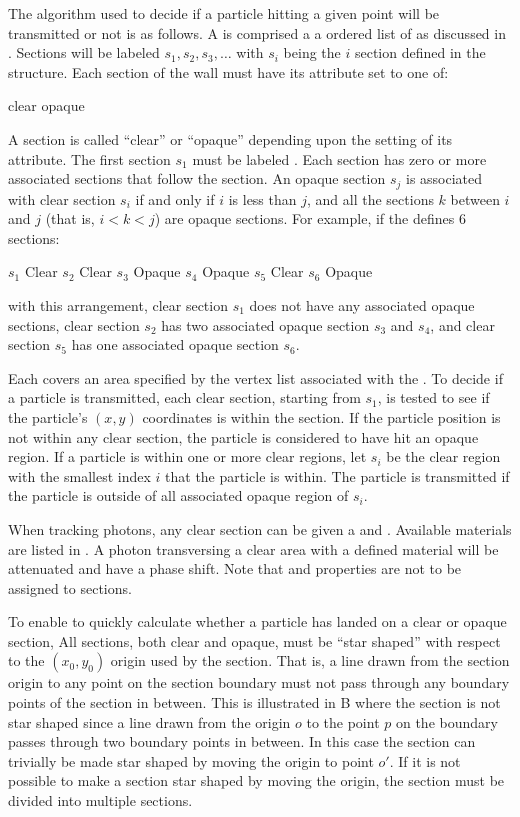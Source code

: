 The algorithm used to decide if a particle hitting a given point will be transmitted or not is as
follows.  A  is comprised a a ordered list of  as discussed in
.  Sections will be labeled $s_1, s_2, s_3, \ldots$ with $s_i$ being the $i$\Th
section defined in the  structure. Each section of the wall must have its 
attribute set to one of:
\begin{example}
  clear
  opaque
\end{example}
A section is called ``clear'' or ``opaque'' depending upon the setting of its  attribute.
The first section $s_1$ must be labeled . Each  section has zero or more
associated  sections that follow the  section. An opaque section $s_j$ is
associated with clear section $s_i$ if and only if $i$ is less than $j$, and all the sections $k$
between $i$ and $j$ (that is, $i < k < j$) are opaque sections. For example, if the 
defines 6 sections:
\begin{example}
  \(s_1\)   Clear
  \(s_2\)   Clear
  \(s_3\)   Opaque
  \(s_4\)   Opaque
  \(s_5\)   Clear
  \(s_6\)   Opaque
\end{example}
with this arrangement, clear section $s_1$ does not have any associated opaque sections, clear section
$s_2$ has two associated opaque section $s_3$ and $s_4$, and clear section $s_5$ has one associated
opaque section $s_6$.

Each  covers an area specified by the vertex list associated with the . To
decide if a particle is transmitted, each clear section, starting from $s_1$, is tested to see if
the particle's $(x,y)$ coordinates is within the section. If the particle position is not within any
clear section, the particle is considered to have hit an opaque region. If a particle is within one
or more clear regions, let $s_i$ be the clear region with the smallest index $i$ that the particle
is within. The particle is transmitted if the particle is outside of all associated opaque region of
$s_i$.

When tracking photons, any clear section can be given a  and . Available
materials are listed in . A photon transversing a clear area with a defined
material will be attenuated and have a phase shift. Note that  and 
properties are not to be assigned to  sections.

To enable \bmad to quickly calculate whether a particle has landed on a clear or opaque section, All
sections, both clear and opaque, must be ``star shaped'' with respect to the $(x_0, y_0)$ origin
used by the section. That is, a line drawn from the section origin to any point on the section
boundary must not pass through any boundary points of the section in between. This is illustrated in
B where the section is not star shaped since a line drawn from the origin $o$ to
the point $p$ on the boundary passes through two boundary points in between. In this case the
section can trivially be made star shaped by moving the origin to point $o'$. If it is not possible
to make a section star shaped by moving the origin, the section must be divided into multiple
sections.

